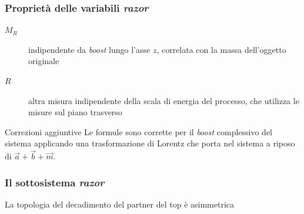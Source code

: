 \documentclass[italian]{beamer}
\begin{document}
\begin{frame}
    \frametitle{Propriet\`a delle variabili \emph{razor}}
    \begin{description}
        \item[$M_R$] indipendente da \emph{boost} lungo l'asse $z$,
            correlata con la massa dell'oggetto originale
        \item[$R$] altra misura indipendente della scala di energia del
            processo, che utilizza le misure sul piano trasverso
    \end{description}

    \begin{block}
        {Correzioni aggiuntive}
        Le formule sono corrette per il \emph{boost} complessivo del sistema applicando
        una trasformazione di Lorentz che porta nel sistema a riposo di $\vec{a} + \vec{b} +
        \vec{m}.$
    \end{block}
\end{frame}

\begin{frame}
    \frametitle{Il sottosistema \emph{razor}}
    \alert{La topologia del decadimento del partner del top \`e asimmetrica}

\end{frame}
\end{document}
